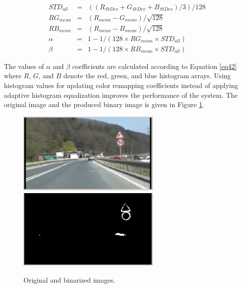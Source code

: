 \documentclass[twocolumn,letterpaper,10pt]{article}
\begin{document}
\begin{eqnarray}
\label{eq42}
\nonumber STD_{all} &=& ((R_{StDev} + G_{StDev} + B_{StDev})/3)/128 \\
\nonumber RG_{mean} &=& (R_{mean}-G_{mean})/\sqrt{128} \\
RB_{mean} &=& (R_{mean}-B_{mean})/\sqrt{128} \\
\nonumber \alpha &=& 1 - 1 / (128 \times RG_{mean} \times STD_{all}) \\
\nonumber \beta &=& 1 - 1 / (128 \times RB_{mean} \times STD_{all})
\end{eqnarray}
\par
The values of $\alpha$ and $\beta$ coefficients are calculated according to Equation \ref{eq42} where $R$, $G$, and $B$ denote the red, green, and blue histogram arrays. Using histogram values for updating color remapping coefficients instead of applying adaptive histogram equalization improves the performance of the system. The original image and the produced binary image is given in Figure \ref{fig:sdfig1}.
\begin{figure}[ht]
\begin{center}
\includegraphics[width=70mm,height=40mm]{img/sdfig1.eps}
\includegraphics[width=70mm,height=40mm]{img/sdfig2.eps}
\caption{Original and binarized images.}
\label{fig:sdfig1}
\end{center}
\end{figure}
\end{document}
